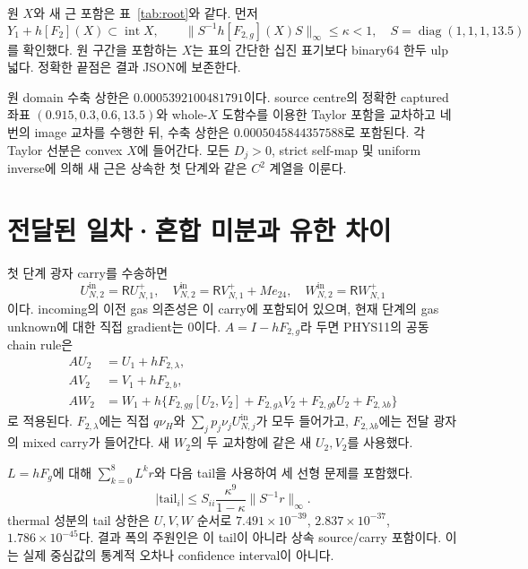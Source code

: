 \documentclass[11pt,a4paper]{article}
\newcommand{\R}{\mathsf R}
\newcommand{\vu}{\nu_H}
\begin{document}
원 $X$와 새 근 포함은 표~\ref{tab:root}와 같다. 먼저
\begin{equation}
Y_1+h[F_2](X)\subset\operatorname{int}X,\qquad
\|S^{-1}h[F_{2,g}](X)S\|_\infty\le\kappa<1,\quad
S=\operatorname{diag}(1,1,1,13.5)
\end{equation}
를 확인했다. 원 구간을 포함하는 $X$는 표의 간단한 십진 표기보다 binary64 한두 ulp 넓다. 정확한 끝점은 결과 JSON에 보존한다.


원 domain 수축 상한은 $0.0005392100481791$이다. source centre의 정확한 captured 좌표 $(0.915,0.3,0.6,13.5)$와 whole-$X$ 도함수를 이용한 Taylor 포함을 교차하고 네 번의 image 교차를 수행한 뒤, 수축 상한은 $0.0005045844357588$로 포함된다. 각 Taylor 선분은 convex $X$에 들어간다. 모든 $D_j>0$, strict self-map 및 uniform inverse에 의해 새 근은 상속한 첫 단계와 같은 $C^2$ 계열을 이룬다.\cite{result,review}

\section{전달된 일차·혼합 미분과 유한 차이}
첫 단계 광자 carry를 수송하면
\begin{equation}
U^{\mathrm{in}}_{N,2}=\R U^+_{N,1},\quad
V^{\mathrm{in}}_{N,2}=\R V^+_{N,1}+M e_{24},\quad
W^{\mathrm{in}}_{N,2}=\R W^+_{N,1}
\end{equation}
이다. incoming의 이전 gas 의존성은 이 carry에 포함되어 있으며, 현재 단계의 gas unknown에 대한 직접 gradient는 0이다. $A=I-hF_{2,g}$라 두면 PHYS11의 공동 chain rule은
\begin{align}
AU_2&=U_1+hF_{2,\lambda},\\
AV_2&=V_1+hF_{2,b},\\
AW_2&=W_1+h\{F_{2,gg}[U_2,V_2]+F_{2,g\lambda}V_2
 +F_{2,gb}U_2+F_{2,\lambda b}\}
\end{align}
로 적용된다. $F_{2,\lambda}$에는 직접 $q\vu$와 $\sum_jp_j\nu_jU^{\mathrm{in}}_{N,j}$가 모두 들어가고, $F_{2,\lambda b}$에는 전달 광자의 mixed carry가 들어간다. 새 $W_2$의 두 교차항에 같은 새 $U_2,V_2$를 사용했다.\cite{phys11,result}

$L=hF_g$에 대해 $\sum_{k=0}^8L^k r$와 다음 tail을 사용하여 세 선형 문제를 포함했다.
\begin{equation}
 |\mathrm{tail}_i|\le S_{ii}\frac{\kappa^9}{1-\kappa}\|S^{-1}r\|_\infty.
\end{equation}
thermal 성분의 tail 상한은 $U,V,W$ 순서로 $7.491\times10^{-39}$, $2.837\times10^{-37}$, $1.786\times10^{-45}$다. 결과 폭의 주원인은 이 tail이 아니라 상속 source/carry 포함이다. 이는 실제 중심값의 통계적 오차나 confidence interval이 아니다.
\end{document}
